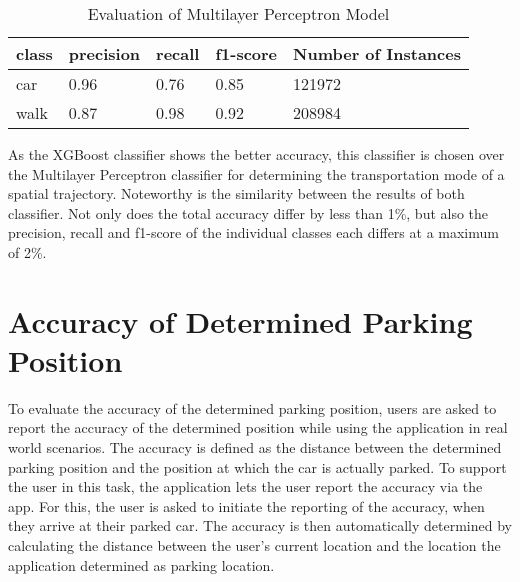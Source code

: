 \begin{table}[h!]
    \centering
    \begin{tabular}{|l|l|l|l|l|} \toprule
        class & precision & recall & f1-score & Number of Instances \\ \midrule
        car & 0.96 & 0.76 & 0.85 & 121972 \\
        walk & 0.87 & 0.98 & 0.92 & 208984 \\ \bottomrule 
    \end{tabular}
    \caption{Evaluation of Multilayer Perceptron Model}
    \label{table:mlp_eval}
\end{table}{}

As the XGBoost classifier shows the better accuracy, this classifier is chosen over the Multilayer Perceptron classifier for determining the transportation mode of a spatial trajectory. Noteworthy is the similarity between the results of both classifier. Not only does the total accuracy differ by less than 1\%, but also the precision, recall and f1-score of the individual classes each differs at a maximum of 2\%.
     
\section{Accuracy of Determined Parking Position}

To evaluate the accuracy of the determined parking position, users are asked to report the accuracy of the determined position while using the application in real world scenarios. The accuracy is defined as the distance between the determined parking position and the position at which the car is actually parked. To support the user in this task, the application lets the user report the accuracy via the app. For this, the user is asked to initiate the reporting of the accuracy, when they arrive at their parked car. The accuracy is then automatically determined by calculating the distance between the user's current location and the location the application determined as parking location.


